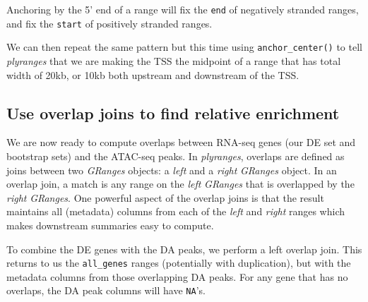 \documentclass[
]{article}
\newenvironment{Shaded}{}{}
\newcommand{\DataTypeTok}[1]{\textcolor[rgb]{0.56,0.13,0.00}{#1}}
\newcommand{\DecValTok}[1]{\textcolor[rgb]{0.25,0.63,0.44}{#1}}
\newcommand{\FloatTok}[1]{\textcolor[rgb]{0.25,0.63,0.44}{#1}}
\newcommand{\KeywordTok}[1]{\textcolor[rgb]{0.00,0.44,0.13}{\textbf{#1}}}
\newcommand{\NormalTok}[1]{#1}
\newcommand{\OperatorTok}[1]{\textcolor[rgb]{0.40,0.40,0.40}{#1}}
\newcommand{\StringTok}[1]{\textcolor[rgb]{0.25,0.44,0.63}{#1}}
\begin{document}
\begin{Shaded}
\end{Shaded}

Anchoring by the 5' end of a range will fix the \texttt{end} of negatively stranded
ranges, and fix the \texttt{start} of positively stranded ranges.

We can then repeat the same pattern but this time using \texttt{anchor\_center()} to
tell \emph{plyranges} that we are making the TSS the midpoint of a range that has
total width of 20kb, or 10kb both upstream and downstream of the TSS.

\begin{Shaded}
\end{Shaded}

\hypertarget{use-overlap-joins-to-find-relative-enrichment}{%
\subsection{Use overlap joins to find relative enrichment}\label{use-overlap-joins-to-find-relative-enrichment}}

We are now ready to compute overlaps between RNA-seq genes (our DE set and
bootstrap sets) and the ATAC-seq peaks. In \emph{plyranges}, overlaps are defined as
joins between two \emph{GRanges} objects: a \emph{left} and a \emph{right} \emph{GRanges} object.
In an overlap join, a match is any range on the \emph{left} \emph{GRanges} that is
overlapped by the \emph{right} \emph{GRanges}. One powerful aspect of the overlap joins
is that the result maintains all (metadata) columns from each of the \emph{left} and
\emph{right} ranges which makes downstream summaries easy to compute.

To combine the DE genes with the DA peaks, we perform a left overlap join. This
returns to us the \texttt{all\_genes} ranges (potentially with duplication), but with
the metadata columns from those overlapping DA peaks. For any gene that has no
overlaps, the DA peak columns will have \texttt{NA}'s.
\end{document}
